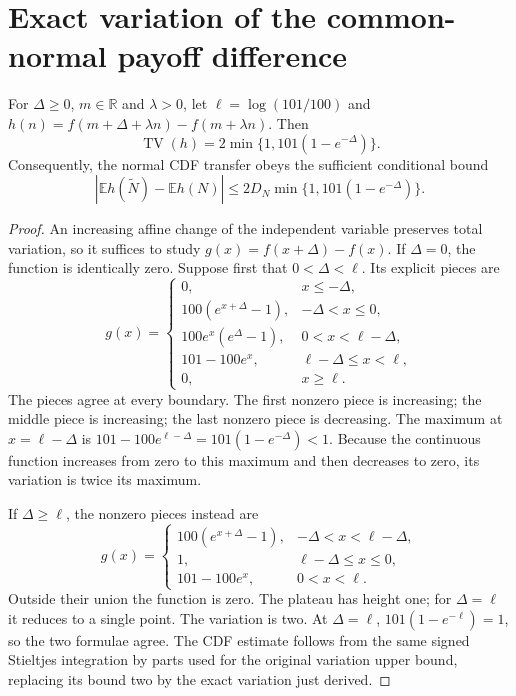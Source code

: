 \section{Exact variation of the common-normal payoff difference}
\label{sec:raw-exact-variation}

\begin{proposition}
\label{prop:raw-exact-variation}
For $\Delta\geq0$, $m\in\mathbb R$ and $\lambda>0$, let
$\ell=\log(101/100)$ and
$h(n)=f(m+\Delta+\lambda n)-f(m+\lambda n)$. Then
\[
 \operatorname{TV}(h)
 =2\min\{1,101(1-e^{-\Delta})\}.
\]
Consequently, the normal CDF transfer obeys the sufficient conditional
bound
\[
 |\mathbb E h(\widetilde N)-\mathbb E h(N)|
 \leq2D_N\min\{1,101(1-e^{-\Delta})\}.
\]
\end{proposition}
\begin{proof}
An increasing affine change of the independent variable preserves total
variation, so it suffices to study
$g(x)=f(x+\Delta)-f(x)$. If $\Delta=0$, the function is identically
zero. Suppose first that $0<\Delta<\ell$. Its explicit pieces are
\[
 g(x)=\begin{cases}
 0,&x\leq-\Delta,\\
 100(e^{x+\Delta}-1),&-\Delta<x\leq0,\\
 100e^x(e^\Delta-1),&0<x<\ell-\Delta,\\
 101-100e^x,&\ell-\Delta\leq x<\ell,\\
 0,&x\geq\ell.
 \end{cases}
\]
The pieces agree at every boundary. The first nonzero piece is increasing;
the middle piece is increasing; the last nonzero piece is decreasing.
The maximum at $x=\ell-\Delta$ is
$101-100e^{\ell-\Delta}=101(1-e^{-\Delta})<1$.
Because the continuous function increases from zero to this maximum and
then decreases to zero, its variation is twice its maximum.

If $\Delta\geq\ell$, the nonzero pieces instead are
\[
 g(x)=\begin{cases}
 100(e^{x+\Delta}-1),&-\Delta<x<\ell-\Delta,\\
 1,&\ell-\Delta\leq x\leq0,\\
 101-100e^x,&0<x<\ell.
 \end{cases}
\]
Outside their union the function is zero. The plateau has height one;
for $\Delta=\ell$ it reduces to a single point. The variation is two.
At $\Delta=\ell$, $101(1-e^{-\ell})=1$, so the two formulae agree.
The CDF estimate follows from the same signed Stieltjes integration by
parts used for the original variation upper bound, replacing its bound
two by the exact variation just derived.
\end{proof}

